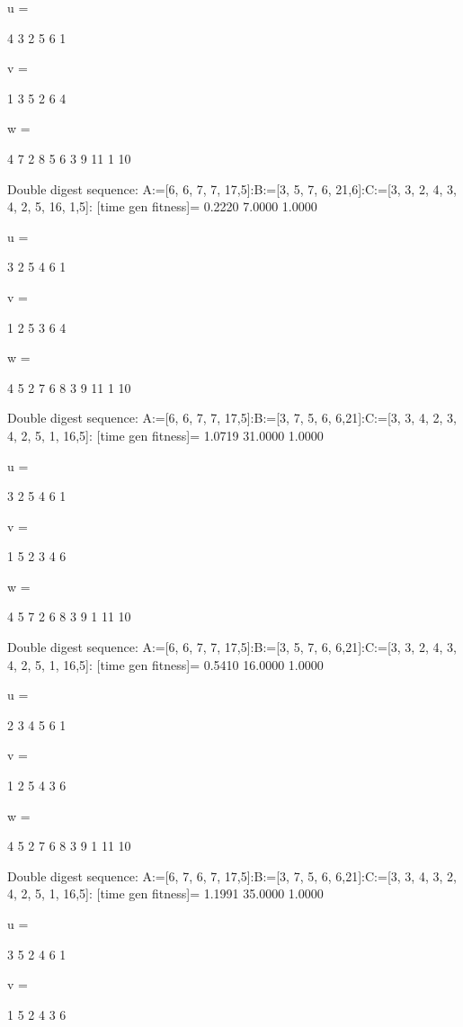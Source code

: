 u =

     4     3     2     5     6     1


v =

     1     3     5     2     6     4


w =

     4     7     2     8     5     6     3     9    11     1    10

Double digest sequence:
A:=[6, 6, 7, 7, 17,5]:B:=[3, 5, 7, 6, 21,6]:C:=[3, 3, 2, 4, 3, 4, 2, 5, 16, 1,5]:
[time gen fitness]=
    0.2220    7.0000    1.0000


u =

     3     2     5     4     6     1


v =

     1     2     5     3     6     4


w =

     4     5     2     7     6     8     3     9    11     1    10

Double digest sequence:
A:=[6, 6, 7, 7, 17,5]:B:=[3, 7, 5, 6, 6,21]:C:=[3, 3, 4, 2, 3, 4, 2, 5, 1, 16,5]:
[time gen fitness]=
    1.0719   31.0000    1.0000


u =

     3     2     5     4     6     1


v =

     1     5     2     3     4     6


w =

     4     5     7     2     6     8     3     9     1    11    10

Double digest sequence:
A:=[6, 6, 7, 7, 17,5]:B:=[3, 5, 7, 6, 6,21]:C:=[3, 3, 2, 4, 3, 4, 2, 5, 1, 16,5]:
[time gen fitness]=
    0.5410   16.0000    1.0000


u =

     2     3     4     5     6     1


v =

     1     2     5     4     3     6


w =

     4     5     2     7     6     8     3     9     1    11    10

Double digest sequence:
A:=[6, 7, 6, 7, 17,5]:B:=[3, 7, 5, 6, 6,21]:C:=[3, 3, 4, 3, 2, 4, 2, 5, 1, 16,5]:
[time gen fitness]=
    1.1991   35.0000    1.0000


u =

     3     5     2     4     6     1


v =

     1     5     2     4     3     6


